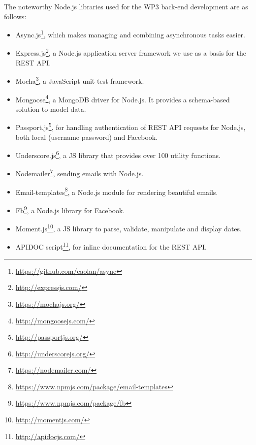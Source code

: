 The noteworthy Node.js libraries used for the WP3 back-end development are as follows:

\begin{itemize}

\item Async.js\footnote{\url{https://github.com/caolan/async}}, which makes managing and combining asynchronous tasks easier. 

\item Express.js\footnote{\url{http://expressjs.com/}}, a Node.js application server framework we use as a basis for the REST API. 

\item Mocha\footnote{\url{https://mochajs.org/}}, a JavaScript unit test framework. 

\item Mongoose\footnote{\url{http://mongoosejs.com/}}, a MongoDB driver for Node.js. It provides a schema-based solution to model data. 

\item Passport.js\footnote{\url{http://passportjs.org/}}, for handling authentication of REST API requests for Node.js, both local (username password) and Facebook. 

\item Underscore.js\footnote{\url{http://underscorejs.org/}}, a JS library that provides over 100 utility functions. 

\item Nodemailer\footnote{\url{https://nodemailer.com/}}, sending emails with Node.js.

\item Email-templates\footnote{\url{https://www.npmjs.com/package/email-templates}}, a Node.js module for rendering beautiful emails.

\item Fb\footnote{\url{https://www.npmjs.com/package/fb}}, a Node.js library for Facebook.

\item Moment.js\footnote{\url{http://momentjs.com/}}, a JS library to parse, validate, manipulate and display dates. 

\item APIDOC script\footnote{\url{http://apidocjs.com/}}, for inline documentation for the REST API. 
\end{itemize}

